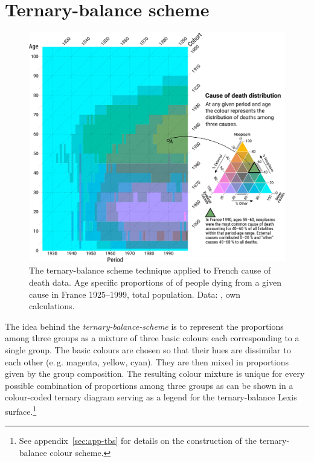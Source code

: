 \documentclass[parskip=half]{scrartcl}
\begin{document}
\section{Ternary-balance scheme} %
\label{sec:tbs}

\begin{figure}[!htb]
  \centering
  \includegraphics[width = \textwidth]{./fig/tern_balance.pdf}
  \caption{The ternary-balance scheme technique applied to French cause of death data. Age specific proportions of of people dying from a given cause in France 1925--1999, total population. Data: \cite{Vallin2014}, own calculations.}
  \label{fig:tbs}
\end{figure}

The idea behind the \emph{ternary-balance-scheme} is to represent the proportions among three groups as a mixture of three basic colours each corresponding to a single group. The basic colours are chosen so that their hues are dissimilar to each other (e.\,g. magenta, yellow, cyan). They are then mixed in proportions given by the group composition. The resulting colour mixture is unique for every possible combination of proportions among three groups as can be shown in a colour-coded ternary diagram serving as a legend for the ternary-balance Lexis surface.\footnote{See appendix~\ref{sec:app-tbs} for details on the construction of the ternary-balance colour scheme.}
\end{document}
